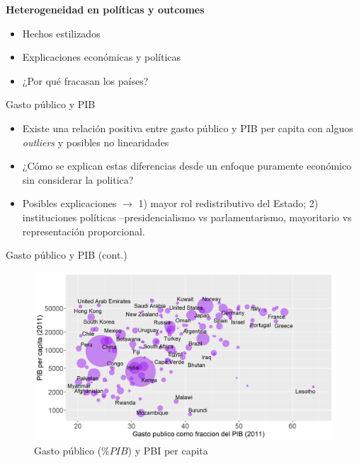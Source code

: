 \documentclass[
  ignorenonframetext,
]{beamer}
\providecommand{\tightlist}{%
  \setlength{\itemsep}{0pt}\setlength{\parskip}{0pt}}\usepackage{longtable,booktabs,array}
\begin{document}
\begin{frame}{\textbf{Heterogeneidad en políticas y outcomes}}
\protect\hypertarget{heterogeneidad-en-poluxedticas-y-outcomes}{}
\begin{itemize}
\tightlist
\item
  Hechos estilizados
\item
  Explicaciones económicas y políticas
\item
  ¿Por qué fracasan los países?
\end{itemize}

\begin{block}{Gasto público y PIB}
\protect\hypertarget{gasto-puxfablico-y-pib}{}
\begin{itemize}
\tightlist
\item
  Existe una relación positiva entre gasto público y PIB per capita con
  alguos \emph{outliers} y posibles no linearidades
\item
  ¿Cómo se explican estas diferencias desde un enfoque puramente
  económico sin considerar la politica?
\item
  Posibles explicaciones \(\longrightarrow\) 1) mayor rol redistributivo
  del Estado; 2) instituciones políticas --presidencialismo vs
  parlamentarismo, mayoritario vs representación proporcional.
\end{itemize}
\end{block}

\begin{block}{Gasto público y PIB (cont.)}
\protect\hypertarget{gasto-puxfablico-y-pib-cont.}{}
\begin{figure}

{\centering \includegraphics{../epol/fig/fig-01-001.png}

}

\caption{Gasto público (\(\%PIB\)) y PBI per capita}


\end{figure}
\end{block}
\end{frame}
\end{document}
